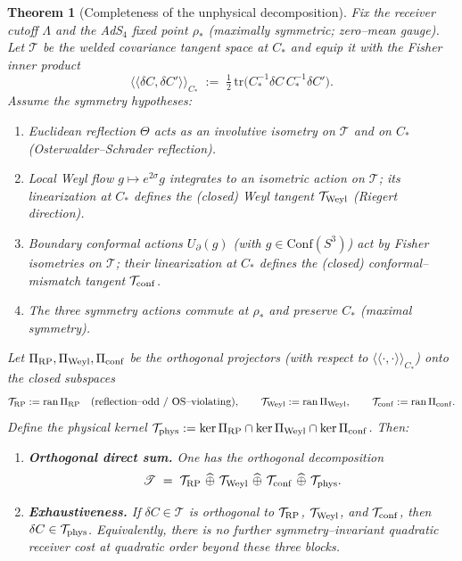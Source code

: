 \documentclass[10pt]{article}
\theoremstyle{definition}
\theoremstyle{plain}
\newtheorem{theorem}{Theorem}[section]
\begin{document}
\begin{theorem}[Completeness of the unphysical decomposition]\label{thm:completeness}
Fix the receiver cutoff $\Lambda$ and the AdS$_4$ fixed point $\rho_\ast$ (maximally symmetric; zero–mean gauge). 
Let $\mathscr T$ be the welded covariance tangent space at $C_\ast$ and equip it with the Fisher inner product
\[
\langle\!\langle \delta C,\delta C'\rangle\!\rangle_{C_\ast}
\;:=\;\tfrac12\,\mathrm{tr}\!\big(C_\ast^{-1}\delta C\,C_\ast^{-1}\delta C'\big).
\]
Assume the symmetry hypotheses:
\begin{enumerate}[label=(S\arabic*),leftmargin=2.1em]
\item \emph{Euclidean reflection} $\Theta$ acts as an involutive isometry on $\mathscr T$ and on $C_\ast$ (Osterwalder–Schrader reflection).
\item \emph{Local Weyl flow} $g\mapsto e^{2\sigma}g$ integrates to an isometric action on $\mathscr T$; its linearization at $C_\ast$ defines the (closed) Weyl tangent $\mathcal T_{\rm Weyl}$ (Riegert direction).
\item \emph{Boundary conformal actions} $U_\partial(g)$ (with $g\in\mathrm{Conf}(S^3)$) act by Fisher isometries on $\mathscr T$; their linearization at $C_\ast$ defines the (closed) conformal–mismatch tangent $\mathcal T_{\rm conf}$.
\item The three symmetry actions commute at $\rho_\ast$ and preserve $C_\ast$ (maximal symmetry).
\end{enumerate}
Let $\Pi_{\rm RP},\Pi_{\rm Weyl},\Pi_{\rm conf}$ be the orthogonal projectors (with respect to $\langle\!\langle\cdot,\cdot\rangle\!\rangle_{C_\ast}$) onto the closed subspaces
\[
\mathcal T_{\rm RP} := \mathrm{ran}\,\Pi_{\rm RP}\quad(\text{reflection–odd / OS–violating}),\qquad
\mathcal T_{\rm Weyl} := \mathrm{ran}\,\Pi_{\rm Weyl},\qquad
\mathcal T_{\rm conf} := \mathrm{ran}\,\Pi_{\rm conf}.
\]
Define the \emph{physical} kernel $\mathcal T_{\rm phys}:=\ker\Pi_{\rm RP}\cap\ker\Pi_{\rm Weyl}\cap\ker\Pi_{\rm conf}$.
Then:
\begin{enumerate}[leftmargin=2.1em]
\item \textbf{Orthogonal direct sum.} One has the orthogonal decomposition
\[
\mathscr T\;=\;\mathcal T_{\rm RP}\ \widehat\oplus\ \mathcal T_{\rm Weyl}\ \widehat\oplus\ \mathcal T_{\rm conf}\ \widehat\oplus\ \mathcal T_{\rm phys}.
\]
\item \textbf{Exhaustiveness.} If $\delta C\in\mathscr T$ is orthogonal to $\mathcal T_{\rm RP}$, $\mathcal T_{\rm Weyl}$, and $\mathcal T_{\rm conf}$, then $\delta C\in\mathcal T_{\rm phys}$. Equivalently, there is no further symmetry–invariant quadratic receiver cost at quadratic order beyond these three blocks.

\end{enumerate}
\end{theorem}
\end{document}

